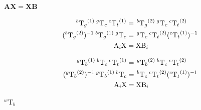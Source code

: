 \documentclass{article}
\begin{document}
$\mathbf{A}\mathbf{X}=\mathbf{X}\mathbf{B}$
\pagebreak

\[    \begin{align*}
    ^{b}{\textrm{T}_g}^{(1)} \hspace{0.2em} ^{g}\textrm{T}_c \hspace{0.2em} ^{c}{\textrm{T}_t}^{(1)} &=
    \hspace{0.1em} ^{b}{\textrm{T}_g}^{(2)} \hspace{0.2em} ^{g}\textrm{T}_c \hspace{0.2em} ^{c}{\textrm{T}_t}^{(2)} \\

    (^{b}{\textrm{T}_g}^{(2)})^{-1} \hspace{0.2em} ^{b}{\textrm{T}_g}^{(1)} \hspace{0.2em} ^{g}\textrm{T}_c &=
    \hspace{0.1em} ^{g}\textrm{T}_c \hspace{0.2em} ^{c}{\textrm{T}_t}^{(2)} (^{c}{\textrm{T}_t}^{(1)})^{-1} \\

    \textrm{A}_i \textrm{X} &= \textrm{X} \textrm{B}_i \\
    \end{align*}
\]
\pagebreak

\[    \begin{align*}
    ^{g}{\textrm{T}_b}^{(1)} \hspace{0.2em} ^{b}\textrm{T}_c \hspace{0.2em} ^{c}{\textrm{T}_t}^{(1)} &=
    \hspace{0.1em} ^{g}{\textrm{T}_b}^{(2)} \hspace{0.2em} ^{b}\textrm{T}_c \hspace{0.2em} ^{c}{\textrm{T}_t}^{(2)} \\

    (^{g}{\textrm{T}_b}^{(2)})^{-1} \hspace{0.2em} ^{g}{\textrm{T}_b}^{(1)} \hspace{0.2em} ^{b}\textrm{T}_c &=
    \hspace{0.1em} ^{b}\textrm{T}_c \hspace{0.2em} ^{c}{\textrm{T}_t}^{(2)} (^{c}{\textrm{T}_t}^{(1)})^{-1} \\

    \textrm{A}_i \textrm{X} &= \textrm{X} \textrm{B}_i \\
    \end{align*}
\]
\pagebreak

$_{}^{w}\textrm{T}_b$
\pagebreak
\end{document}
